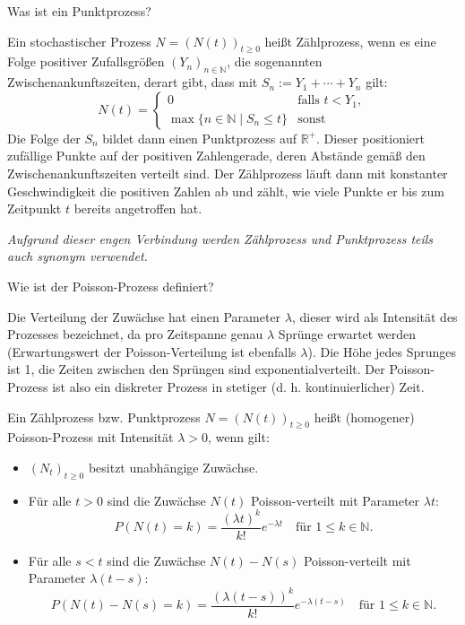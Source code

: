 \begin{QandA}
    \item Was ist ein Punktprozess?
    \begin{answered}
        Ein stochastischer Prozess $N=(N(t))_{t\geq 0}$ heißt Zählprozess, wenn es eine Folge positiver Zufallsgrößen $(Y_{n})_{n\in \mathbb{N}}$, die sogenannten Zwischenankunftszeiten, derart gibt, dass mit $S_{n}:=Y_{1}+\dotsb +Y_{n}$ gilt:
        \[
            N(t) =
            \begin{cases}
                0                                             & \text{falls } t < Y_{1}, \\
                \max \{ n \in \mathbb{N} \mid S_{n} \leq t \} & \text{sonst}
            \end{cases}
        \]
        Die Folge der $S_{n}$ bildet dann einen Punktprozess auf $\mathbb{R}^{+}$.
        Dieser positioniert zufällige Punkte auf der positiven Zahlengerade, deren Abstände gemäß den Zwischenankunftszeiten verteilt sind.
        Der Zählprozess läuft dann mit konstanter Geschwindigkeit die positiven Zahlen ab und zählt, wie viele Punkte er bis zum Zeitpunkt $t$ bereits angetroffen hat.

        \textit{Aufgrund dieser engen Verbindung werden Zählprozess und Punktprozess teils auch synonym verwendet.}
    \end{answered}

    \item Wie ist der Poisson-Prozess definiert?
    \begin{answered}
        Die Verteilung der Zuwächse hat einen Parameter $\lambda$, dieser wird als Intensität des Prozesses bezeichnet, da pro Zeitspanne genau $\lambda$ Sprünge erwartet werden (Erwartungswert der Poisson-Verteilung ist ebenfalls $\lambda$).
        Die Höhe jedes Sprunges ist 1, die Zeiten zwischen den Sprüngen sind exponentialverteilt.
        Der Poisson-Prozess ist also ein diskreter Prozess in stetiger (d. h. kontinuierlicher) Zeit.

        Ein Zählprozess bzw. Punktprozess $N=(N(t))_{t\geq 0}$ heißt (homogener) Poisson-Prozess mit Intensität $\lambda > 0$, wenn gilt:
        \begin{itemize}
            \item $(N_{t})_{t\geq 0}$ besitzt unabhängige Zuwächse.
            \item Für alle $t>0$ sind die Zuwächse $N(t)$ Poisson-verteilt mit Parameter $\lambda t$:
                  \[
                      P(N(t)=k) = \frac{(\lambda t)^{k}}{k!} e^{-\lambda t} \quad \text{für } 1 \leq k \in \mathbb{N}.
                  \]
            \item Für alle $s<t$ sind die Zuwächse $N(t) - N(s)$ Poisson-verteilt mit Parameter $\lambda (t-s)$:
                  \[
                      P(N(t) - N(s) = k) = \frac{(\lambda (t-s))^{k}}{k!} e^{-\lambda (t-s)} \quad \text{für } 1 \leq k \in \mathbb{N}.
                  \]
        \end{itemize}
    \end{answered}


\end{QandA}
